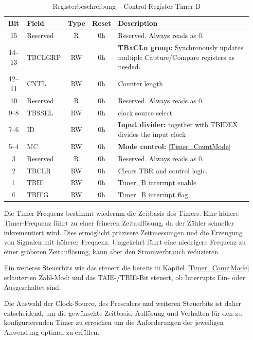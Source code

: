 \begin{table}[h!]
	\small
	\centering
	\begin{tabular}{|c|l|c|c|p{8cm}|}
		\hline
		\textbf{Bit} & \textbf{Field} & \textbf{Type} & \textbf{Reset} & \textbf{Description} \\ \hline
		15 & Reserved & R & 0h & Reserved. Always reads as 0. \\ \hline
		14–13 & TBCLGRP & RW & 0h & \textbf{TBxCLn group:} Synchronously updates multiple Capture/Compare registers as needed. \\ \hline
		12–11 & CNTL & RW & 0h & Counter length \\ \hline
		10 & Reserved & R & 0h & Reserved. Always reads as 0. \\ \hline
		9–8 & TBSSEL & RW & 0h & clock source select \\ \hline
		7–6 & ID & RW & 0h & \textbf{Input divider:} together with TBIDEX divides the input clock \\ \hline
		5–4 & MC & RW & 0h & \textbf{Mode control:} \ref{Timer_CountMode} \\ \hline
		3 & Reserved & R & 0h & Reserved. Always reads as 0. \\ \hline
		2 & TBCLR & RW & 0h & Clears TBR and control logic. \\ \hline
		1 & TBIE & RW & 0h & Timer\_B interrupt enable \\ \hline
		0 & TBIFG & RW & 0h & Timer\_B interrupt flag \\ \hline
	\end{tabular}
	\caption{Registerbeschreibung – Control Register Timer B\\}
	\label{tab:tb_c_register}
\end{table}

Die Timer-Frequenz bestimmt wiederum die Zeitbasis des Timers. Eine h\"ohere Timer-Frequenz f\"uhrt zu einer feineren Zeitaufl\"osung, da der Z\"ahler schneller inkrementiert wird. Dies erm\"oglicht pr\"azisere Zeitmessungen und die Erzeugung von Signalen mit h\"oherer Frequenz. Umgekehrt f\"uhrt eine niedrigere Frequenz zu einer gr\"oberen Zeitaufl\"osung, kann aber den Stromverbrauch reduzieren.

Ein weiteres Steuerbits wie das  steuert die bereits in Kapitel \ref{Timer_CountMode} erl\"auterten Z\"ahl-Modi und das TAIE-/TBIE-Bit steuert, ob Interrupts Ein- oder Ausgeschaltet sind.

Die Auswahl der Clock-Source, des Prescalers und weiteren Steuerbits ist daher entscheidend, um die gew\"unschte Zeitbasis, Aufl\"osung und Verhalten f\"ur den zu konfigurierenden Timer zu erreichen um die Anforderungen der jeweiligen Anwendung optimal zu erf\"ullen.

